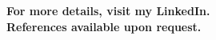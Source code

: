 \documentclass[11pt, a4paper]{awesome-cv}
\begin{document}

  \vspace*{\fill}
  \begin{center}
      \textbf{For more details, visit my LinkedIn.} \\
      \textbf{References available upon request.}
  \end{center}

\end{document}

